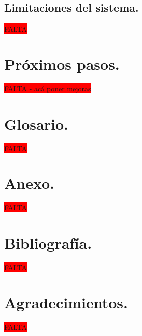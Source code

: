 \documentclass[12pt,a4paper]{article}
\begin{document}
\subsection{Limitaciones del sistema.}
\colorbox{red}{FALTA}
 
\section{Próximos pasos.}  
\colorbox{red}{FALTA - acá poner mejoras}

\section{Glosario.}
\colorbox{red}{FALTA}

\section{Anexo.}
\colorbox{red}{FALTA}

\section{Bibliografía.}
\colorbox{red}{FALTA}

\section{Agradecimientos.}
\colorbox{red}{FALTA}
\end{document}
